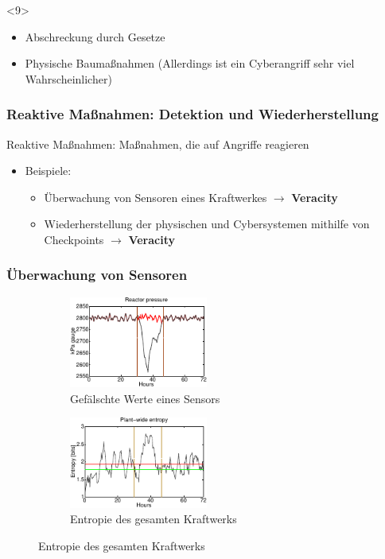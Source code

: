 \documentclass{sikslides}
\begin{document}
\begin{frame}[t]
        \begin{onlyenv}<9>
            \begin{itemize}
                \item Abschreckung durch Gesetze
                \item Physische Baumaßnahmen (Allerdings ist ein Cyberangriff sehr viel Wahrscheinlicher)
            \end{itemize}
        \end{onlyenv}
    \end{frame}

    \begin{frame}
        \frametitle{Reaktive Maßnahmen: Detektion und Wiederherstellung}
        \begin{block}{}
            Reaktive Maßnahmen: Maßnahmen, die auf Angriffe reagieren
        \end{block}
        \begin{itemize}
            \item Beispiele:
            \begin{itemize}
                \item Überwachung von Sensoren eines Kraftwerkes $\rightarrow$ \textbf{Veracity}
                \item Wiederherstellung der physischen und Cybersystemen mithilfe von Checkpoints $\rightarrow$ \textbf{Veracity}
            \end{itemize}
        \end{itemize}
    \end{frame}

    \begin{frame}
        \frametitle{Überwachung von Sensoren}
        \begin{figure}
            \centering
            \begin{subfigure}{0.49\textwidth}
                \includegraphics[height=3cm]{../figure/entropy_a}
                \caption{Gefälschte Werte eines Sensors}
            \end{subfigure}
            \begin{subfigure}{0.49\textwidth}
                \includegraphics[height=3cm]{../figure/entropy_b}
                \caption{Entropie des gesamten Kraftwerks}
            \end{subfigure}
        \end{figure}
    \end{frame}
\end{document}
